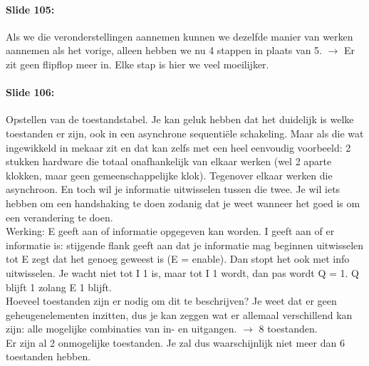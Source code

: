 \documentclass[10pt,a4paper]{book}
\begin{document}
\paragraph{Slide 105:} Als we die veronderstellingen aannemen kunnen we dezelfde manier van werken aannemen als het vorige, alleen hebben we nu 4 stappen in plaats van 5. $\rightarrow$ Er zit geen flipflop meer in. Elke stap is hier we veel moeilijker.

\paragraph{Slide 106:} Opstellen van de toestandstabel. Je kan geluk hebben dat het duidelijk is welke toestanden er zijn, ook in een asynchrone sequenti\"ele schakeling. Maar als die wat ingewikkeld in mekaar zit en dat kan zelfs met een heel eenvoudig voorbeeld: 2 stukken hardware die totaal onafhankelijk van elkaar werken (wel 2 aparte klokken, maar geen gemeenschappelijke klok). Tegenover elkaar werken die asynchroon. En toch wil je informatie uitwisselen tussen die twee. Je wil iets hebben om een handshaking te doen zodanig dat je weet wanneer het goed is om een verandering te doen.\\
Werking: E geeft aan of informatie opgegeven kan worden. I geeft aan of er informatie is: stijgende flank geeft aan dat je informatie mag beginnen uitwisselen tot E zegt dat het genoeg geweest is (E = enable). Dan stopt het ook met info uitwisselen. Je wacht niet tot I 1 is, maar tot I 1 wordt, dan pas wordt Q = 1. Q blijft 1 zolang E 1 blijft.\\
Hoeveel toestanden zijn er nodig om dit te beschrijven? Je weet dat er geen geheugenelementen inzitten, dus je kan zeggen wat er allemaal verschillend kan zijn: alle mogelijke combinaties van in- en uitgangen. $\rightarrow$ 8 toestanden.\\
Er zijn al 2 onmogelijke toestanden. Je zal dus waarschijnlijk niet meer dan 6 toestanden hebben.
\end{document}
